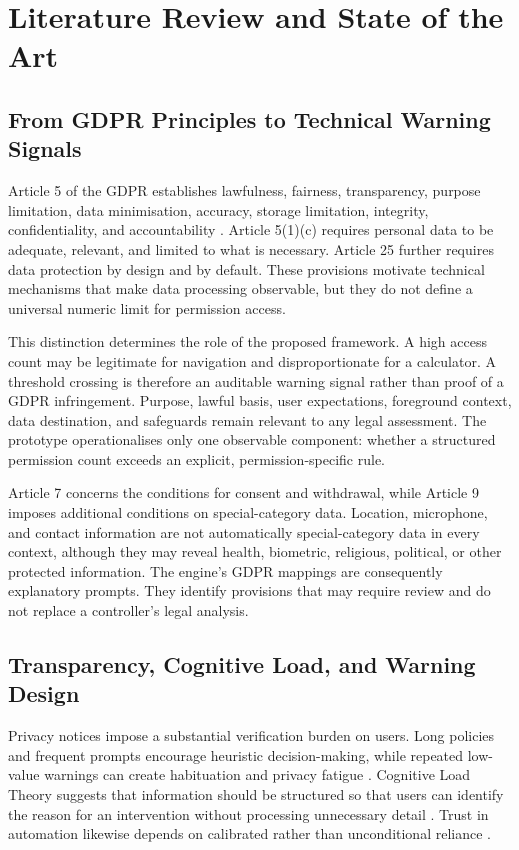 \newpage
\section{Literature Review and State of the Art}

\subsection{From GDPR Principles to Technical Warning Signals}

Article 5 of the GDPR establishes lawfulness, fairness, transparency, purpose limitation, data minimisation, accuracy, storage limitation, integrity, confidentiality, and accountability \cite{1}. Article 5(1)(c) requires personal data to be adequate, relevant, and limited to what is necessary. Article 25 further requires data protection by design and by default. These provisions motivate technical mechanisms that make data processing observable, but they do not define a universal numeric limit for permission access.

This distinction determines the role of the proposed framework. A high access count may be legitimate for navigation and disproportionate for a calculator. A threshold crossing is therefore an auditable warning signal rather than proof of a GDPR infringement. Purpose, lawful basis, user expectations, foreground context, data destination, and safeguards remain relevant to any legal assessment. The prototype operationalises only one observable component: whether a structured permission count exceeds an explicit, permission-specific rule.

Article 7 concerns the conditions for consent and withdrawal, while Article 9 imposes additional conditions on special-category data. Location, microphone, and contact information are not automatically special-category data in every context, although they may reveal health, biometric, religious, political, or other protected information. The engine's GDPR mappings are consequently explanatory prompts. They identify provisions that may require review and do not replace a controller's legal analysis.

\subsection{Transparency, Cognitive Load, and Warning Design}

Privacy notices impose a substantial verification burden on users. Long policies and frequent prompts encourage heuristic decision-making, while repeated low-value warnings can create habituation and privacy fatigue \cite{12,13,27}. Cognitive Load Theory suggests that information should be structured so that users can identify the reason for an intervention without processing unnecessary detail \cite{27}. Trust in automation likewise depends on calibrated rather than unconditional reliance \cite{34}.

